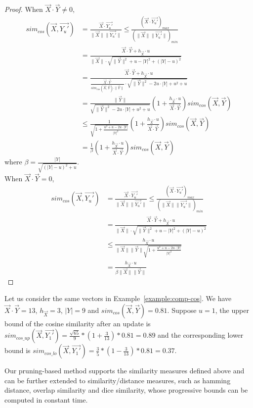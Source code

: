 \begin{proof}
When $\vec{X}\cdot \vec{Y} \neq 0$,
\begin{align*}
sim_{cos}(\vec{X}, \vec{Y_u'}) &= \frac{\vec{X}\cdot \vec{Y_u'}}{\|\vec{X}\|\|\vec{Y_u'}\|} \leq \frac{(\vec{X}\cdot \vec{Y_u'})_{max}}{(\|\vec{X}\|\|\vec{Y_u'}\|)_{min}} \\
&= \frac{\vec{X} \cdot \vec{Y}+h_{\vec{X}} \cdot u}{\| \vec{X} \| \cdot \sqrt{\|\vec{Y}\|^2+u-|Y|^2+(|Y|-u)^2}}\\
&= \frac{\vec{X} \cdot \vec{Y}+h_{\vec{X}} \cdot u}{\frac{\vec{X} \cdot \vec{Y}}{sim_{cos}(\vec{X}, \vec{Y}) \cdot \|\vec{Y}\|}\cdot \sqrt{\|\vec{Y}\|^2-2u\cdot |Y|+u^2+u}}\\
&= \frac{\|\vec{Y}\|}{\sqrt{\|\vec{Y}\|^2-2u\cdot |Y|+u^2+u}}(1+\frac{h_{\vec{X}}\cdot u}{\vec{X}\cdot \vec{Y}})sim_{cos}(\vec{X}, \vec{Y})\\
&\leq \frac{1}{\sqrt{1+\frac{u^2+u-2u\cdot |Y|}{|Y|^2}}}(1+\frac{h_{\vec{X}}\cdot u}{\vec{X}\cdot \vec{Y}})sim_{cos}(\vec{X}, \vec{Y})\\
&= \frac{1}{\beta}(1+\frac{h_{\vec{X}}\cdot u}{\vec{X}\cdot \vec{Y}})sim_{cos}(\vec{X}, \vec{Y})
\end{align*}
where $\beta=\frac{|Y|}{\sqrt{(|Y|-u)^2+u}}$. \\ \newline
\indent When $\vec{X}\cdot \vec{Y} = 0$,
\begin{align*}
sim_{cos}(\vec{X}, \vec{Y_u'}) &= \frac{\vec{X}\cdot \vec{Y_u'}}{\|\vec{X}\|\|\vec{Y_u'}\|} \leq \frac{(\vec{X}\cdot \vec{Y_u'})_{max}}{(\|\vec{X}\|\|\vec{Y_u'}\|)_{min}} \\
&= \frac{\vec{X} \cdot \vec{Y}+h_{\vec{X}} \cdot u}{\| \vec{X} \| \cdot \sqrt{\|\vec{Y}\|^2+u-|Y|^2+(|Y|-u)^2}}\\
&\leq \frac{h_{\vec{X}} \cdot u}{\| \vec{X} \|\| \vec{Y} \| \sqrt{1+\frac{u^2+u-2u\cdot |Y|}{|Y|^2}}}\\
&= \frac{h_{\vec{X}}\cdot u}{\beta \|\vec{X}\|\|\vec{Y}\|}
\end{align*}

\end{proof}

\begin{example} 
Let us consider the same vectors in Example~\ref{example:comp-cos}. We have $\vec{X}\cdot \vec{Y} = 13$, $h_{\vec{X}}=3$, $|Y|=9$ and $sim_{cos}(\vec{X}, \vec{Y}) = 0.81$. Suppose $u=1$, the upper bound of the cosine similarity after an update is $sim_{cos\_up}(\vec{X}, \vec{Y_1'}) = \frac{\sqrt{65}}{9}*(1+\frac{3}{13})*0.81=0.89$ and the corresponding lower bound is $sim_{cos\_lo}(\vec{X}, \vec{Y_1'}) = \frac{3}{5}*(1-\frac{3}{13})*0.81=0.37$.
\end{example}

Our pruning-based method supports the similarity measures defined above and can be further extended to similarity/distance measures, such as hamming distance, overlap similarity and dice similarity, whose progressive bounds can be computed in constant time.


